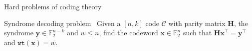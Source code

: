 \begin{frame}{Hard problems of coding theory}
    \begin{block}{Syndrome decoding problem~\cite{berlekamp1978inherent}}
        Given a $[n, k]$ code $\mathcal{C}$ with parity matrix $\mathbf{H}$, the syndrome $\mathbf{y} \in \mathds{F}_2^{n-k}$ and $w \leq n$, find
        the codeword $\mathbf{x} \in \mathds{F}_2^n$ such that $\mathbf{Hx}^\top = \mathbf{y}^\top$ and $\mathtt{wt}(\mathbf{x}) = w$. 
    \end{block}
\end{frame}
